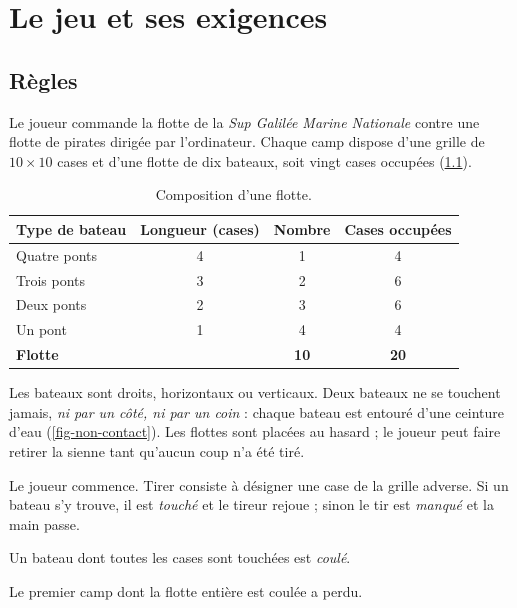 \chapter{Le jeu et ses exigences}
\label{chap-exigences}

\section{Règles}

Le joueur commande la flotte de la \emph{Sup Galilée Marine Nationale} contre une flotte de
pirates dirigée par l'ordinateur. Chaque camp dispose d'une grille de $10 \times 10$ cases et
d'une flotte de dix bateaux, soit vingt cases occupées (\cref{tab-flotte}).

\begin{table}[ht]
    \centering
    \begin{tabular}{@{}lccc@{}}
        \toprule
        Type de bateau  & Longueur (cases) & Nombre      & Cases occupées \\
        \midrule
        Quatre ponts    & 4                & 1           & 4              \\
        Trois ponts     & 3                & 2           & 6              \\
        Deux ponts      & 2                & 3           & 6              \\
        Un pont         & 1                & 4           & 4              \\
        \midrule
        \textbf{Flotte} &                  & \textbf{10} & \textbf{20}    \\
        \bottomrule
    \end{tabular}
    \caption{Composition d'une flotte.}
    \label{tab-flotte}
\end{table}

\begin{description}[style=nextline, leftmargin=1.2em]
    \item[Placement] Les bateaux sont droits, horizontaux ou verticaux. Deux bateaux ne se
          touchent jamais, \emph{ni par un côté, ni par un coin} : chaque bateau est entouré d'une
          ceinture d'eau (\cref{fig-non-contact}). Les flottes sont placées au hasard ; le joueur
          peut faire retirer la sienne tant qu'aucun coup n'a été tiré.
    \item[Tour de jeu] Le joueur commence. Tirer consiste à désigner une case de la grille
          adverse. Si un bateau s'y trouve, il est \emph{touché} et le tireur rejoue ; sinon le
          tir est \emph{manqué} et la main passe.
    \item[Bateau coulé] Un bateau dont toutes les cases sont touchées est \emph{coulé}.
    \item[Fin de partie] Le premier camp dont la flotte entière est coulée a perdu.
\end{description}

